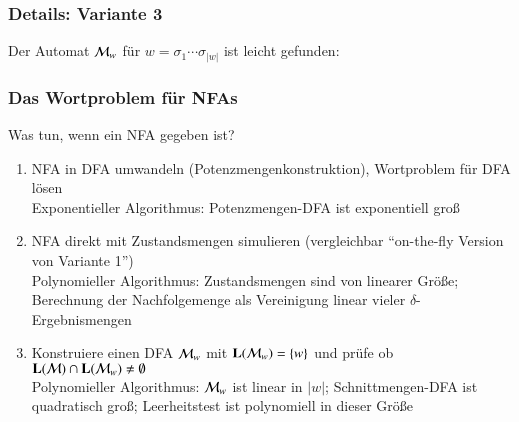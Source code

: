 \documentclass[onlymath]{beamer}
\begin{document}
\begin{frame}\frametitle{Details: Variante 3}

Der Automat $\mathcal{M}_w$ für $w=\sigma_1\cdots\sigma_{|w|}$ ist leicht gefunden:
\bigskip

\bigskip


\end{frame}

\begin{frame}\frametitle{Das Wortproblem für NFAs}

Was tun, wenn ein NFA gegeben ist?
\begin{enumerate}[{Variante} 1:]
\item \alert{NFA in DFA umwandeln (Potenzmengenkonstruktion), Wortproblem für DFA lösen}\\
	Exponentieller Algorithmus: Potenzmengen-DFA ist exponentiell groß
\item \alert{NFA direkt mit Zustandsmengen simulieren (vergleichbar "`on-the-fly Version von Variante 1"')}\\
	Polynomieller Algorithmus: Zustandsmengen sind von linearer Größe; Berechnung der Nachfolgemenge als
	Vereinigung linear vieler $\delta$-Ergebnismengen
\item \alert{Konstruiere einen DFA $\mathcal{M}_w$ mit $\textbf{\textcolor{black}{L}}(\mathcal{M}_w)=\{w\}$ und prüfe ob
$\textbf{\textcolor{black}{L}}(\mathcal{M})\cap \textbf{\textcolor{black}{L}}(\mathcal{M}_w) \neq\emptyset$}\\
	Polynomieller Algorithmus: $\mathcal{M}_w$ ist linear in $|w|$; Schnittmengen-DFA ist quadratisch groß;
	Leerheitstest ist polynomiell in dieser Größe
\end{enumerate}

\end{frame}
\end{document}
